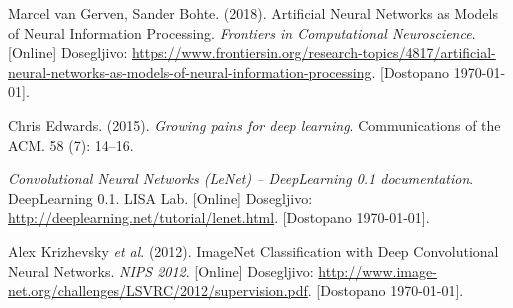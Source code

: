 \documentclass[a4paper,11pt,titlepage]{article}
\begin{document}
\begin{thebibliography}{99}
 Marcel van Gerven, Sander Bohte. (2018). Artificial Neural Networks as Models of Neural Information Processing.
	\emph{Frontiers in Computational Neuroscience}. [Online] Dosegljivo:
	\url{https://www.frontiersin.org/research-topics/4817/artificial-neural-networks-as-models-of-neural-information-processing}.
	[Dostopano \today].

 Chris Edwards. (2015). \emph{Growing pains for deep learning}. Communications of the ACM. 58 (7): 14–16.

 \emph{Convolutional Neural Networks (LeNet) – DeepLearning 0.1 documentation}. DeepLearning 0.1. LISA Lab.
	[Online] Dosegljivo: \url{http://deeplearning.net/tutorial/lenet.html}. [Dostopano \today].

 Alex Krizhevsky \emph{et al}. (2012). ImageNet Classification with Deep Convolutional Neural Networks.
	\emph{NIPS 2012}. [Online] Dosegljivo: \url{http://www.image-net.org/challenges/LSVRC/2012/supervision.pdf}. [Dostopano \today].

\end{thebibliography}
\end{document}

